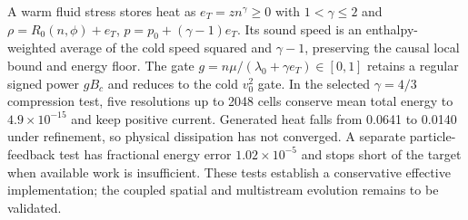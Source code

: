 A warm fluid stress stores heat as $e_T=z n^\gamma\ge0$ with
$1<\gamma\le2$ and
$\rho=R_0(n,\phi)+e_T$, $p=p_0+(\gamma-1)e_T$.
Its sound speed is an enthalpy-weighted average of the cold speed squared
and $\gamma-1$, preserving the causal local bound and energy floor.
The gate $g=n\mu/(\lambda_0+\gamma e_T)\in[0,1]$ retains a regular
signed power $gB_c$ and reduces to the cold $v_0^2$ gate.
In the selected $\gamma=4/3$ compression test, five resolutions up to
2048 cells conserve mean total energy to $4.9\times10^{-15}$ and keep
positive current. Generated heat falls from 0.0641 to 0.0140 under
refinement, so physical dissipation has not converged. A separate
particle-feedback test has fractional energy error $1.02\times10^{-5}$
and stops short of the target when available work is insufficient.
These tests establish a conservative effective implementation; the
coupled spatial and multistream evolution remains to be validated.
